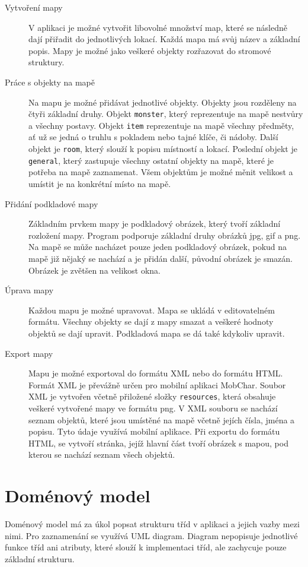 \documentclass[thesis=B,czech]{resources/FITthesis}[2012/06/26]
\begin{document}
	\begin{description}
		\item[Vytvoření mapy]
V aplikaci je možné vytvořit libovolné množství map, které se následně dají přiřadit do jednotlivých lokací. Každá mapa má svůj název a základní popis. Mapy je možné jako veškeré objekty rozřazovat do stromové struktury. 

		\item[Práce s objekty na mapě]
Na mapu je možné přidávat jednotlivé objekty. Objekty jsou rozděleny na čtyři základní druhy. Objekt \texttt{monster}, který reprezentuje na mapě nestvůry a všechny postavy. Objekt \texttt{item} reprezentuje na mapě všechny předměty, ať už se jedná o truhlu s pokladem nebo tajné klíče, či nádoby. Další objekt je \texttt{room}, který slouží k popisu místností a lokací. Poslední objekt je \texttt{general}, který zastupuje všechny ostatní objekty na mapě, které je potřeba na mapě zaznamenat. Všem objektům je možné měnit velikost a umístit je na konkrétní místo na mapě.

		\item[Přidání podkladové mapy]
Základním prvkem mapy je podkladový obrázek, který tvoří základní rozložení mapy. Program podporuje základní druhy obrázků jpg, gif a png. Na mapě se může nacházet pouze jeden podkladový obrázek, pokud na mapě již nějaký se nachází a je přidán další, původní obrázek je smazán. Obrázek je zvětšen na velikost okna.

		\item[Úprava mapy]
Každou mapu je možné upravovat. Mapa se ukládá v editovatelném formátu. Všechny objekty se dají z mapy smazat a veškeré hodnoty objektů se dají upravit. Podkladová mapa se dá také kdykoliv upravit.  
		
		\item[Export mapy]
Mapu je možné exportoval do formátu XML nebo do formátu HTML. Formát XML je převážně určen pro mobilní aplikaci MobChar. Soubor XML je vytvořen včetně přiložené složky \texttt{resources}, která obsahuje veškeré vytvořené mapy ve formátu png. V XML souboru se nachází seznam objektů, které jsou umístěné na mapě včetně jejích čísla, jména a popisu. Tyto údaje využívá mobilní aplikace. Při exportu do formátu HTML, se vytvoří stránka, jejíž hlavní část tvoří obrázek s mapou, pod kterou se nachází seznam všech objektů.

	\end{description}
	\section{Doménový model}
Doménový model má za úkol popsat strukturu tříd v aplikaci a jejich vazby mezi nimi. Pro zaznamenání se využívá UML diagram. Diagram nepopisuje jednotlivé funkce tříd ani atributy, které slouží k implementaci tříd, ale zachycuje pouze základní strukturu.
\end{document}
